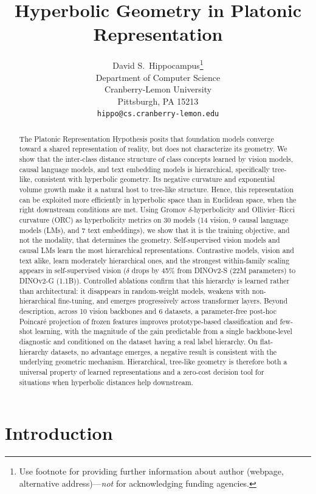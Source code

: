 \documentclass{article}
\title{Hyperbolic Geometry in Platonic Representation}
\author{%
  David S.~Hippocampus\thanks{Use footnote for providing further information
    about author (webpage, alternative address)---\emph{not} for acknowledging
    funding agencies.} \\
  Department of Computer Science\\
  Cranberry-Lemon University\\
  Pittsburgh, PA 15213 \\
  \texttt{hippo@cs.cranberry-lemon.edu} \\
}
\begin{document}
\maketitle


\begin{abstract}
The Platonic Representation Hypothesis posits that foundation models converge toward a shared representation of reality, but does not characterize its geometry. We show that the inter-class distance structure of class concepts learned by vision models, causal language models, and text embedding models is hierarchical, specifically tree-like, consistent with hyperbolic geometry. Its negative curvature and exponential volume growth make it a natural host to tree-like structure. Hence, this representation can be exploited more efficiently in hyperbolic space than in Euclidean space, when the right downstream conditions are met. Using Gromov $\delta$-hyperbolicity and Ollivier--Ricci curvature (ORC) as hyperbolicity metrics on 30 models (14 vision, 9 causal language models (LMs), and 7 text embeddings), we show that it is the training objective, and not the modality, that determines the geometry. Self-supervised vision models and causal LMs learn the most hierarchical representations. Contrastive models, vision and text alike, learn moderately hierarchical ones, and the strongest within-family scaling appears in self-supervised vision ($\delta$ drops by 45\% from DINOv2-S (22M parameters) to DINOv2-G (1.1B)). Controlled ablations confirm that this hierarchy is learned rather than architectural: it disappears in random-weight models, weakens with non-hierarchical fine-tuning, and emerges progressively across transformer layers. Beyond description, across 10 vision backbones and 6 datasets, a parameter-free post-hoc Poincar\'{e} projection of frozen features improves prototype-based classification and few-shot learning, with the magnitude of the gain predictable from a single backbone-level diagnostic and conditioned on the dataset having a real label hierarchy. On flat-hierarchy datasets, no advantage emerges, a negative result is consistent with the underlying geometric mechanism. Hierarchical, tree-like geometry is therefore both a universal property of learned representations and a zero-cost decision tool for situations when hyperbolic distances help downstream.
\end{abstract}


\section{Introduction}
\label{sec:introduction}
\end{document}
